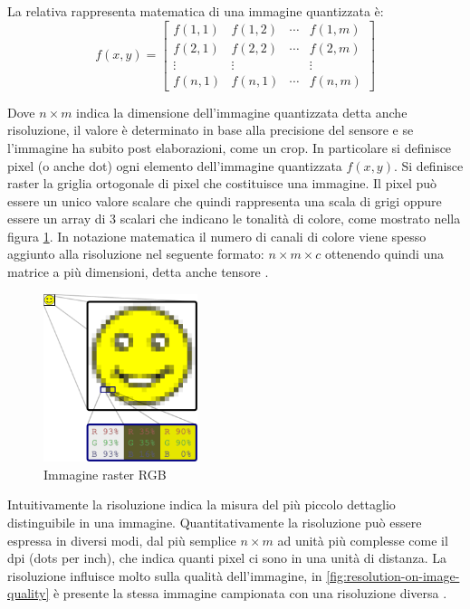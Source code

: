 La relativa rappresenta matematica di una immagine quantizzata è:
\[ f(x, y)=\left[\begin{array}{cccc}f(1,1) & f(1,2) & \cdots & f(1, m) \\ f(2,1) & f(2,2) & \cdots & f(2, m) \\ \vdots & \vdots & & \vdots \\ f(n,1) & f(n,1) & \cdots & f(n,m)\end{array}\right] \]

Dove \(n\times m\) indica la dimensione dell'immagine quantizzata detta anche risoluzione, il valore è determinato in base alla precisione del sensore e se l'immagine ha subito post elaborazioni, come un crop. In particolare si definisce pixel  (o anche dot) ogni elemento dell'immagine quantizzata \(f(x, y)\). Si definisce raster la griglia ortogonale di pixel che costituisce una immagine. Il pixel può essere un unico valore scalare che quindi rappresenta una scala di grigi oppure essere un array di 3 scalari che indicano le tonalità di colore, come mostrato nella figura \cref{fig:rgb-raster-image}. In notazione matematica il numero di canali di colore viene spesso aggiunto alla risoluzione nel seguente formato: \(n\times m \times c\) ottenendo quindi una matrice a più dimensioni, detta anche tensore \cite{gonzalez_dip}.

\begin{figure}[ht]
    \centering
    \includegraphics[width=0.4\textwidth]{frame/Rgb-raster-image.pdf}
    \caption{Immagine raster RGB}
    \label{fig:rgb-raster-image}
\end{figure}

Intuitivamente la risoluzione indica la  misura del più piccolo dettaglio distinguibile in una immagine. Quantitativamente la risoluzione può essere espressa in diversi modi, dal più semplice \(n\times m\) ad unità più complesse come il dpi (dots per inch), che indica quanti pixel ci sono in una unità di distanza. La risoluzione influisce molto sulla qualità dell'immagine, in \cref{fig:resolution-on-image-quality} è presente la stessa immagine campionata con una risoluzione diversa \cite{gonzalez_dip} \cite{spaepen_resolution}.

